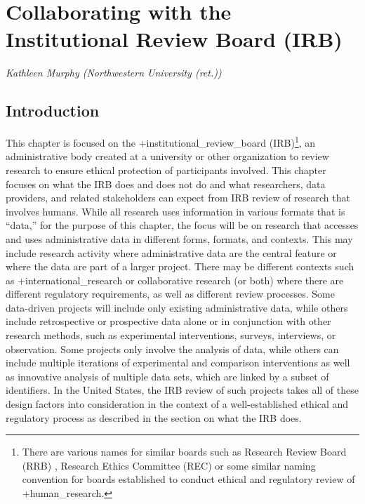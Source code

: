 \documentclass[
]{WileySix}
\begin{document}
\hypertarget{irb}{%
\section{Collaborating with the Institutional Review Board (IRB)}\label{irb}}

\emph{Kathleen Murphy (Northwestern University (ret.))}

\hypertarget{introduction}{%
\subsection{Introduction}\label{introduction}}

This chapter is focused on the +institutional\_review\_board\textbar{} (IRB)\footnote{There are various names for similar boards such as Research Review Board (RRB) \citet{chicagopublicschools2020}, Research Ethics Committee (REC) \citet{nhshealthresearchauthority2020} or some similar naming convention for boards established to conduct ethical and regulatory review of +human\_research\textbar.}, an administrative body created at a university or other organization to review research to ensure ethical protection of participants involved. This chapter focuses on what the IRB does and does not do and what researchers, data providers, and related stakeholders can expect from IRB review of research that involves humans. While all research uses information in various formats that is ``data,'' for the purpose of this chapter, the focus will be on research that accesses and uses administrative data in different forms, formats, and contexts. This may include research activity where administrative data are the central feature or where the data are part of a larger project. There may be different contexts such as +international\_research\textbar{} or collaborative research (or both) where there are different regulatory requirements, as well as different review processes. Some data-driven projects will include only existing administrative data, while others include retrospective or prospective data alone or in conjunction with other research methods, such as experimental interventions, surveys, interviews, or observation. Some projects only involve the analysis of data, while others can include multiple iterations of experimental and comparison interventions as well as innovative analysis of multiple data sets, which are linked by a subset of identifiers. In the United States, the IRB review of such projects takes all of these design factors into consideration in the context of a well-established ethical and regulatory process as described in the section on what the IRB does.
\end{document}
